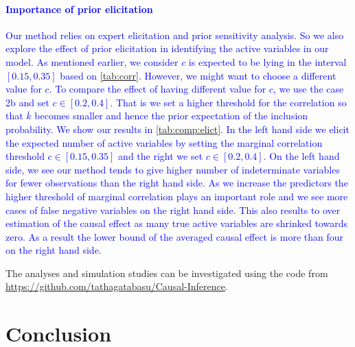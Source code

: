 \documentclass[preprint,12pt]{elsarticle}
\newcommand{\added}[1]{\textcolor{blue}{#1}}
\begin{document}
\paragraph{\added{Importance of prior elicitation}}\label{sec:importance:elicit}
\added{Our method relies on expert elicitation and prior sensitivity analysis. So we also explore the effect of prior elicitation in identifying the active variables in our model. As mentioned earlier,
	we consider $c$ is expected to be lying in the interval $[0.15,0.35]$
	based on \cref{tab:corr}. However, we might want to choose a different
	value for $c$. To compare the effect of having different value for $c$, we use the case 2b and set $c\in[0.2,0.4]$. That is we set a higher threshold for the correlation so that $\overline{k}$ becomes smaller and hence the prior expectation of the inclusion probability. We show our results in \cref{tab:comp:elict}. In the left hand side we elicit the expected number of active variables by setting the marginal correlation threshold $c\in[0.15,0.35]$ and the right we set $c\in[0.2,0.4]$. On the left hand side, we see our method tends to give higher number of indeterminate variables for fewer observations than the right hand side. As we increase the predictors the higher threshold of marginal correlation plays an important role and we see more cases of false negative variables on the right hand side. This also results to over estimation of the causal effect as many true active variables are shrinked towards zero. As a result the lower bound of the averaged causal effect is more than four on the right hand side.}


The analyses and simulation studies can be investigated using the code from \url{https://github.com/tathagatabasu/Causal-Inference}.

\section{Conclusion}\label{sec:conc}
\end{document}
